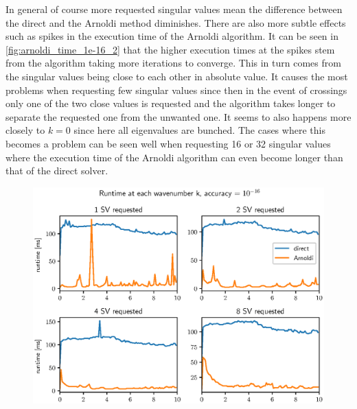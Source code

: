 \documentclass[a4paper, oneside]{discothesis}
\begin{document}
In general of course more requested singular values mean the difference between the direct and the Arnoldi method diminishes.
There are also more subtle effects such as spikes in the execution time of the Arnoldi algorithm.
It can be seen in \ref{fig:arnoldi_time_1e-16_2} that the higher execution times at the spikes stem from the algorithm taking more iterations to converge.
This in turn comes from the singular values being close to each other in absolute value.
It causes the most problems when requesting few singular values since then in the event of crossings only one of the two close values is requested and the algorithm takes longer to separate the requested one from the unwanted one.
It seems to also happens more closely to $k=0$ since here all eigenvalues are bunched.
The cases where this becomes a problem can be seen well when requesting 16 or 32 singular values where the execution time of the Arnoldi algorithm can even become longer than that of the direct solver.
\begin{figure} [H]
	\centering
	\includegraphics[width=0.9\columnwidth]{figures/arnoldi_time_1e-16_1.eps}
	\label{fig:arnoldi_time_1e-16_1}
\end{figure}
\end{document}
